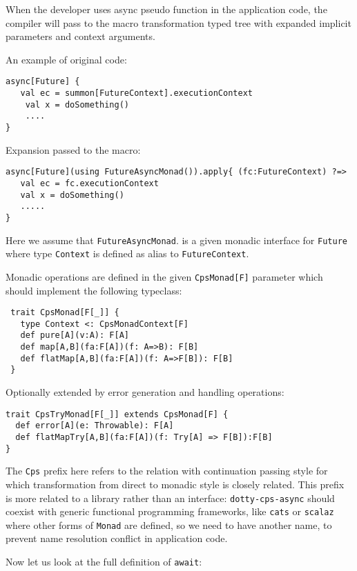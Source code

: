 \documentclass{llncs}
\begin{document}
When the developer uses async pseudo function in the application code, the compiler will pass to the macro transformation typed tree with expanded implicit parameters and context arguments.

An example of original code:
\begin{lstlisting}
async[Future] {
   val ec = summon[FutureContext].executionContext
    val x = doSomething()
    ....
}
\end{lstlisting}

Expansion passed to the macro:
\begin{lstlisting}
async[Future](using FutureAsyncMonad()).apply{ (fc:FutureContext) ?=>
   val ec = fc.executionContext
   val x = doSomething()
   .....
}
\end{lstlisting}

Here we assume that \lstinline|FutureAsyncMonad|. is a given monadic interface for \lstinline|Future| where type \lstinline|Context| is defined as alias to \lstinline|FutureContext|.

Monadic operations are defined in the given \lstinline|CpsMonad[F]| parameter which should implement the following typeclass:

\begin{lstlisting}
 trait CpsMonad[F[_]] {
   type Context <: CpsMonadContext[F]
   def pure[A](v:A): F[A]
   def map[A,B](fa:F[A])(f: A=>B): F[B]
   def flatMap[A,B](fa:F[A])(f: A=>F[B]): F[B]
 }
\end{lstlisting}

Optionally extended by error generation and handling operations:

\begin{lstlisting}
trait CpsTryMonad[F[_]] extends CpsMonad[F] {
  def error[A](e: Throwable): F[A]
  def flatMapTry[A,B](fa:F[A])(f: Try[A] => F[B]):F[B]
}
\end{lstlisting}

The \lstinline|Cps| prefix here refers to the relation with continuation passing style for which transformation from direct to monadic style is closely related. This prefix is more related to a library rather than an interface:  \lstinline|dotty-cps-async| should coexist with generic functional programming frameworks, like \lstinline|cats| or \lstinline|scalaz| where other forms of \lstinline|Monad| are defined, so we need to have another name, to prevent name resolution conflict in application code. 

Now let us look at the full definition of \lstinline|await|:
\end{document}
